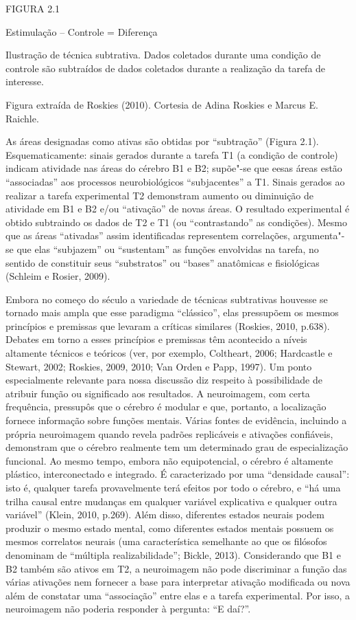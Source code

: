
FIGURA 2.1

Estimulação -- Controle = Diferença

Ilustração de técnica subtrativa. Dados coletados durante uma condição
de controle são subtraídos de dados coletados durante a realização da
tarefa de interesse.

Figura extraída de Roskies (2010). Cortesia de Adina Roskies e Marcus E.
Raichle.

As áreas designadas como ativas são obtidas por ``subtração'' (Figura
2.1). Esquematicamente: sinais  gerados durante a tarefa T1 (a
condição de controle) indicam atividade nas áreas do cérebro B1 e B2;
supõe"-se que eesas áreas estão ``associadas'' aos processos
neurobiológicos ``subjacentes'' a T1. Sinais  gerados ao realizar a
tarefa experimental T2 demonstram aumento ou diminuição de atividade em
B1 e B2 e/ou ``ativação'' de novas áreas. O resultado experimental é
obtido subtraindo os dados de T2 e T1 (ou ``contrastando'' as
condições). Mesmo que as áreas ``ativadas'' assim identificadas
representem correlações, argumenta"-se que elas ``subjazem'' ou
``sustentam'' as funções envolvidas na tarefa, no sentido de constituir
seus ``substratos'' ou ``bases'' anatômicas e fisiológicas (Schleim e
Rosier, 2009).

Embora no começo do século  a variedade de técnicas subtrativas
houvesse se tornado mais ampla que esse paradigma ``clássico'', elas
pressupõem os mesmos princípios e premissas que levaram a críticas
similares (Roskies, 2010, p.638). Debates em torno a esses princípios e
premissas têm acontecido a níveis altamente técnicos e teóricos (ver,
por exemplo, Coltheart, 2006; Hardcastle e Stewart, 2002; Roskies, 2009,
2010; Van Orden e Papp, 1997). Um ponto especialmente relevante para
nossa discussão diz respeito à possibilidade de atribuir função ou
significado aos resultados. A neuroimagem, com certa frequência,
pressupôs que o cérebro é modular e que, portanto, a localização fornece
informação sobre funções mentais. Várias fontes de evidência, incluindo
a própria neuroimagem quando revela padrões replicáveis e ativações
confiáveis, demonstram que o cérebro realmente tem um determinado grau
de especialização funcional. Ao mesmo tempo, embora não equipotencial, o
cérebro é altamente plástico, interconectado e integrado. É
caracterizado por uma ``densidade causal'': isto é, qualquer tarefa
provavelmente terá efeitos por todo o cérebro, e ``há uma trilha causal
entre mudanças em qualquer variável explicativa e qualquer outra
variável'' (Klein, 2010, p.269). Além disso, diferentes estados neurais
podem produzir o mesmo estado mental, como diferentes estados mentais
possuem os mesmos correlatos neurais (uma característica semelhante ao
que os filósofos denominam de ``múltipla realizabilidade''; Bickle,
2013). Considerando que B1 e B2 também são ativos em T2, a neuroimagem
não pode discriminar a função das várias ativações nem fornecer a base
para interpretar ativação modificada ou nova além de constatar uma
``associação'' entre elas e a tarefa experimental. Por isso, a
neuroimagem não poderia responder à pergunta: ``E daí?''.

